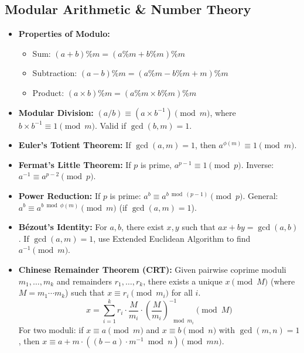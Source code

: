 
\subsection{Modular Arithmetic \& Number Theory}

\begin{itemize}
    \item \textbf{Properties of Modulo:}
          \begin{itemize}
              \item Sum: $(a + b) \% m = (a \% m + b \% m) \% m$
              \item Subtraction: $(a - b) \% m = (a \% m - b \% m + m) \% m$
              \item Product: $(a \times b) \% m = (a \% m \times b \% m) \% m$
          \end{itemize}

    \item \textbf{Modular Division:}
          $(a / b) \equiv (a \times b^{-1}) \pmod m$, where $b \times b^{-1} \equiv 1 \pmod m$.
          Valid if $\gcd(b, m) = 1$.

    \item \textbf{Euler's Totient Theorem:}
          If $\gcd(a, m) = 1$, then $a^{\phi(m)} \equiv 1 \pmod m$.

    \item \textbf{Fermat's Little Theorem:}
          If $p$ is prime, $a^{p-1} \equiv 1 \pmod p$.
          Inverse: $a^{-1} \equiv a^{p-2} \pmod p$.

    \item \textbf{Power Reduction:}
          If $p$ is prime: $a^b \equiv a^{b \bmod (p-1)} \pmod p$.
          General: $a^b \equiv a^{b \bmod \phi(m)} \pmod m$ (if $\gcd(a, m) = 1$).

    \item \textbf{Bézout's Identity:}
          For $a, b$, there exist $x, y$ such that $ax + by = \gcd(a, b)$.
          If $\gcd(a, m) = 1$, use Extended Euclidean Algorithm to find $a^{-1} \pmod m$.

    \item \textbf{Chinese Remainder Theorem (CRT):}
          Given pairwise coprime moduli $m_1, \ldots, m_k$ and remainders $r_1, \ldots, r_k$, there exists a unique $x \pmod{M}$ (where $M = m_1 \cdots m_k$) such that $x \equiv r_i \pmod{m_i}$ for all $i$.
          \[
              x = \sum_{i=1}^{k} r_i \cdot \frac{M}{m_i} \cdot \left(\frac{M}{m_i}\right)^{-1}_{\!\!\!\!\mod m_i} \pmod M
          \]
          For two moduli: if $x \equiv a \pmod{m}$ and $x \equiv b \pmod{n}$ with $\gcd(m,n)=1$, then $x \equiv a + m \cdot ((b-a) \cdot m^{-1} \bmod n) \pmod{mn}$.
\end{itemize}
